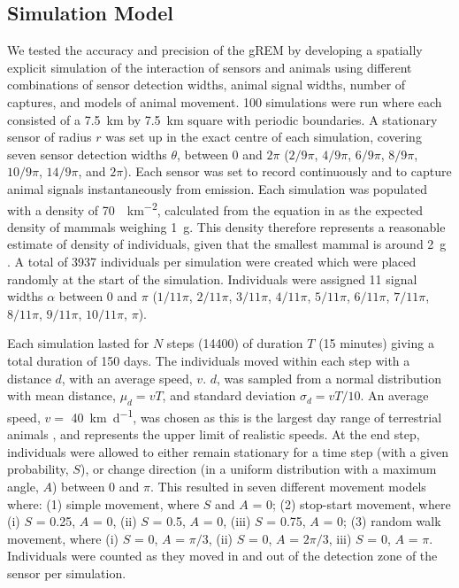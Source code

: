 \documentclass[a4paper,10pt,reqno,oneside]{amsart}
\begin{document}
\subsection*{Simulation Model}

We tested the accuracy and precision of the gREM by developing a spatially explicit simulation of the interaction of sensors and animals using different combinations of sensor detection widths, animal signal widths, number of captures, and models of animal movement. 100 simulations were run where each consisted of a  \SI{7.5}{\kilo\meter} by \SI{7.5}{\kilo\meter} square with periodic boundaries. A stationary sensor of radius $r$ was set up in the exact centre of each simulation, covering seven sensor detection widths $\theta$, between 0 and $2\pi$ ($2/9\pi$, $4/9\pi$, $6/9\pi$, $8/9\pi$, $10/9\pi$, $14/9\pi$, and $2\pi$). Each sensor was set to record continuously and to capture animal signals instantaneously from emission. Each simulation was populated with a density of \SI{70}{\animals\per\kilo\meter\squared}, calculated from the equation in \cite{damuth1981population} as the expected density of mammals weighing \SI{1}{\gram}. This density therefore represents a reasonable estimate of density of individuals, given that the smallest mammal is around \SI{2}{\gram} \citep{jones2009pantheria}. A total of 3937 individuals per simulation were created which were placed randomly at the start of the simulation. Individuals were assigned 11 signal widths $\alpha$ between 0 and $\pi$ ($1/11\pi$, $2/11\pi$, $3/11\pi$, $4/11\pi$, $5/11\pi$, $6/11\pi$, $7/11\pi$, $8/11\pi$, $9/11\pi$, $10/11\pi$, $\pi$). 

Each simulation lasted for $N$ steps (14400) of duration $T$ (15 minutes) giving a total duration of 150 days. The individuals moved within each step with a distance $d$, with an average speed, $v$. $d$, was sampled from a normal distribution with mean distance, $\mu_d = vT$, and standard deviation $\sigma_d = vT/10$. An average speed, $v = $ \SI{40}{\kilo\meter \per \day}, was chosen as this is the largest day range of terrestrial animals \citep{carbone2005far}, and represents the upper limit of realistic speeds. At the end step, individuals were allowed to either remain stationary for a time step (with a given probability, $S$), or change direction (in a uniform distribution with a maximum angle, $A$) between 0 and $\pi$. This resulted in seven different movement models where: (1) simple movement, where $S$ and $A$ = 0; (2) stop-start movement, where (i) $S$ = 0.25, $A$ = 0, (ii) $S$ = 0.5, $A$ = 0, (iii) $S$ = 0.75, $A$ = 0; (3) random walk movement, where (i) $S$ = 0, $A$ = $\pi/3$, (ii) $S$ = 0, $A$ = $2\pi/3$, iii) $S$ = 0, $A$ = $\pi$. Individuals were counted as they moved in and out of the detection zone of the sensor per simulation. 
\end{document}
